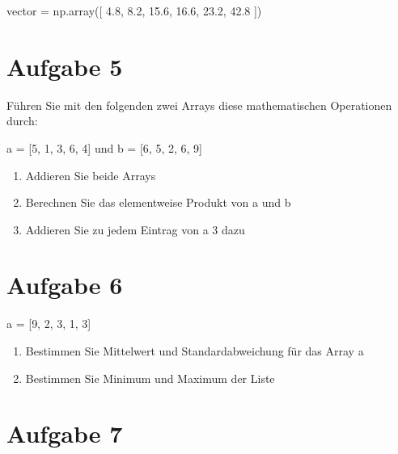 \documentclass[
  letterpaper,
  DIV=11,
  numbers=noendperiod]{scrreprt}
\newenvironment{Shaded}{\begin{snugshade}}{\end{snugshade}}
\newcommand{\FloatTok}[1]{\textcolor[rgb]{0.68,0.00,0.00}{#1}}
\newcommand{\NormalTok}[1]{\textcolor[rgb]{0.00,0.23,0.31}{#1}}
\newcommand{\OperatorTok}[1]{\textcolor[rgb]{0.37,0.37,0.37}{#1}}
\providecommand{\tightlist}{%
  \setlength{\itemsep}{0pt}\setlength{\parskip}{0pt}}\usepackage{longtable,booktabs,array}
\begin{document}
\begin{tcolorbox}
\begin{Shaded}
\begin{Highlighting}[]
\NormalTok{vector }\OperatorTok{=}\NormalTok{ np.array([ }\FloatTok{4.8}\NormalTok{,  }\FloatTok{8.2}\NormalTok{, }\FloatTok{15.6}\NormalTok{, }\FloatTok{16.6}\NormalTok{, }\FloatTok{23.2}\NormalTok{, }\FloatTok{42.8}\NormalTok{ ])}
\end{Highlighting}
\end{Shaded}

\section*{Aufgabe 5}\label{aufgabe-5}


Führen Sie mit den folgenden zwei Arrays diese mathematischen
Operationen durch:

a = {[}5, 1, 3, 6, 4{]} und b = {[}6, 5, 2, 6, 9{]}

\begin{enumerate}
\def\labelenumi{\arabic{enumi}.}
\tightlist
\item
  Addieren Sie beide Arrays
\item
  Berechnen Sie das elementweise Produkt von a und b
\item
  Addieren Sie zu jedem Eintrag von a 3 dazu
\end{enumerate}

\section*{Aufgabe 6}\label{aufgabe-6}


a = {[}9, 2, 3, 1, 3{]}

\begin{enumerate}
\def\labelenumi{\arabic{enumi}.}
\tightlist
\item
  Bestimmen Sie Mittelwert und Standardabweichung für das Array a
\item
  Bestimmen Sie Minimum und Maximum der Liste
\end{enumerate}

\section*{Aufgabe 7}\label{aufgabe-7}


\end{tcolorbox}
\end{document}
